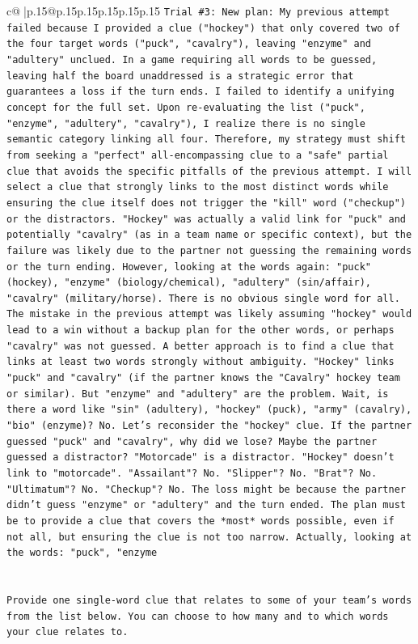 \documentclass{article}
\begin{document}
{\begin{supertabular}{c@{$\;$}|p{.15\linewidth}@{}p{.15\linewidth}p{.15\linewidth}p{.15\linewidth}p{.15\linewidth}p{.15\linewidth}}
{{{\texttt{Trial \#3: New plan: My previous attempt failed because I provided a clue ("hockey") that only covered two of the four target words ("puck", "cavalry"), leaving "enzyme" and "adultery" unclued. In a game requiring all words to be guessed, leaving half the board unaddressed is a strategic error that guarantees a loss if the turn ends. I failed to identify a unifying concept for the full set. Upon re{-}evaluating the list ("puck", "enzyme", "adultery", "cavalry"), I realize there is no single semantic category linking all four. Therefore, my strategy must shift from seeking a "perfect" all{-}encompassing clue to a "safe" partial clue that avoids the specific pitfalls of the previous attempt. I will select a clue that strongly links to the most distinct words while ensuring the clue itself does not trigger the "kill" word ("checkup") or the distractors. "Hockey" was actually a valid link for "puck" and potentially "cavalry" (as in a team name or specific context), but the failure was likely due to the partner not guessing the remaining words or the turn ending. However, looking at the words again: "puck" (hockey), "enzyme" (biology/chemical), "adultery" (sin/affair), "cavalry" (military/horse). There is no obvious single word for all. The mistake in the previous attempt was likely assuming "hockey" would lead to a win without a backup plan for the other words, or perhaps "cavalry" was not guessed. A better approach is to find a clue that links at least two words strongly without ambiguity. "Hockey" links "puck" and "cavalry" (if the partner knows the "Cavalry" hockey team or similar). But "enzyme" and "adultery" are the problem. Wait, is there a word like "sin" (adultery), "hockey" (puck), "army" (cavalry), "bio" (enzyme)? No. Let's reconsider the "hockey" clue. If the partner guessed "puck" and "cavalry", why did we lose? Maybe the partner guessed a distractor? "Motorcade" is a distractor. "Hockey" doesn't link to "motorcade". "Assailant"? No. "Slipper"? No. "Brat"? No. "Ultimatum"? No. "Checkup"? No. The loss might be because the partner didn't guess "enzyme" or "adultery" and the turn ended. The plan must be to provide a clue that covers the *most* words possible, even if not all, but ensuring the clue is not too narrow. Actually, looking at the words: "puck", "enzyme} \\
\\ 
\\ 
\texttt{Provide one single{-}word clue that relates to some of your team's words from the list below. You can choose to how many and to which words your clue relates to.} \\
}}}
\end{supertabular}}
\end{document}
